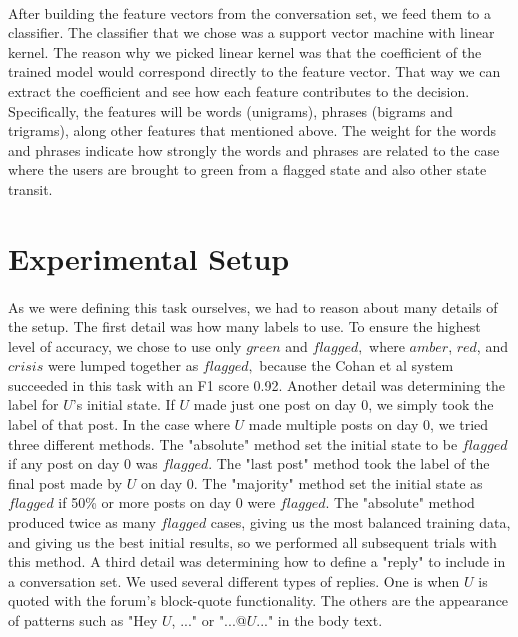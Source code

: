 \documentclass{article}
\begin{document}
\paragraph{}After building the feature vectors from the conversation set, we feed them to a classifier. The classifier that we chose was a support vector machine with linear kernel. The reason why we picked linear kernel was that the coefficient of the trained model would correspond directly to the feature vector. That way we can extract the coefficient and see how each feature contributes to the decision. Specifically, the features will be words (unigrams), phrases (bigrams and trigrams), along other features that mentioned above. The weight for the words and phrases indicate how strongly the words and phrases are related to the case where the users are brought to green from a flagged state and also other state transit. 

\section{Experimental Setup}

\paragraph{}As we were defining this task ourselves, we had to reason about many details of the setup. The first detail was how many labels to use. To ensure the highest level of accuracy, we chose to use only $green$ and $flagged,$ where $amber$, $red$, and $crisis$ were lumped together as $flagged,$ because the Cohan et al system succeeded in this task with an F1 score 0.92. Another detail was determining the label for $U$'s initial state. If $U$ made just one post on day 0, we simply took the label of that post. In the case where $U$ made multiple posts on day 0, we tried three different methods. The "absolute" method set the initial state to be $flagged$ if any post on day 0 was $flagged$. The "last post" method took the label of the final post made by $U$ on day 0. The "majority" method set the initial state as $flagged$ if 50\% or more posts on day 0 were $flagged$. The "absolute" method produced twice as many $flagged$ cases, giving us the most balanced training data, and giving us the best initial results, so we performed all subsequent trials with this method. A third detail was determining how to define a "reply" to include in a conversation set. We used several different types of replies. One is when $U$ is quoted with the forum's block-quote functionality. The others are the appearance of patterns such as "Hey $U$, ..." or "...@$U$..." in the body text.
\end{document}

